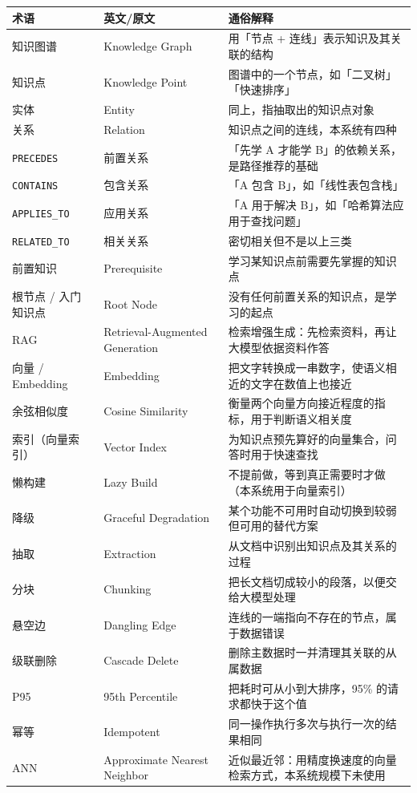 \documentclass[UTF8,a4paper,11pt]{ctexrep}
\begin{document}
\begin{center}
\small
\begin{tabularx}{\linewidth}{@{}XXX@{}}
\toprule
术语 & 英文/原文 & 通俗解释 \\
\midrule
知识图谱 & Knowledge Graph & 用「节点 + 连线」表示知识及其关联的结构 \\
知识点 & Knowledge Point & 图谱中的一个节点，如「二叉树」「快速排序」 \\
实体 & Entity & 同上，指抽取出的知识点对象 \\
关系 & Relation & 知识点之间的连线，本系统有四种 \\
\texttt{PRECEDES} & 前置关系 & 「先学 A 才能学 B」的依赖关系，是路径推荐的基础 \\
\texttt{CONTAINS} & 包含关系 & 「A 包含 B」，如「线性表包含栈」 \\
\texttt{APPLIES\_TO} & 应用关系 & 「A 用于解决 B」，如「哈希算法应用于查找问题」 \\
\texttt{RELATED\_TO} & 相关关系 & 密切相关但不是以上三类 \\
前置知识 & Prerequisite & 学习某知识点前需要先掌握的知识点 \\
根节点 / 入门知识点 & Root Node & 没有任何前置关系的知识点，是学习的起点 \\
RAG & Retrieval-Augmented Generation & 检索增强生成：先检索资料，再让大模型依据资料作答 \\
向量 / Embedding & Embedding & 把文字转换成一串数字，使语义相近的文字在数值上也接近 \\
余弦相似度 & Cosine Similarity & 衡量两个向量方向接近程度的指标，用于判断语义相关度 \\
索引（向量索引） & Vector Index & 为知识点预先算好的向量集合，问答时用于快速查找 \\
懒构建 & Lazy Build & 不提前做，等到真正需要时才做（本系统用于向量索引） \\
降级 & Graceful Degradation & 某个功能不可用时自动切换到较弱但可用的替代方案 \\
抽取 & Extraction & 从文档中识别出知识点及其关系的过程 \\
分块 & Chunking & 把长文档切成较小的段落，以便交给大模型处理 \\
悬空边 & Dangling Edge & 连线的一端指向不存在的节点，属于数据错误 \\
级联删除 & Cascade Delete & 删除主数据时一并清理其关联的从属数据 \\
P95 & 95th Percentile & 把耗时可从小到大排序，95\% 的请求都快于这个值 \\
幂等 & Idempotent & 同一操作执行多次与执行一次的结果相同 \\
ANN & Approximate Nearest Neighbor & 近似最近邻：用精度换速度的向量检索方式，本系统规模下未使用 \\
\bottomrule
\end{tabularx}
\end{center}
\end{document}
